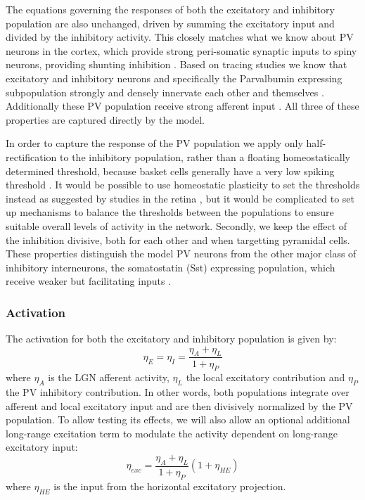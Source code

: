 The equations governing the responses of both the excitatory and
inhibitory population are also unchanged, driven by summing the
excitatory input and divided by the inhibitory activity. This closely
matches what we know about PV neurons in the cortex, which provide
strong peri-somatic synaptic inputs to spiny neurons, providing
shunting inhibition \citep{Atallah2012, Wilson2012}. Based on tracing
studies we know that excitatory and inhibitory neurons and
specifically the Parvalbumin expressing subpopulation strongly and
densely innervate each other and themselves \citep{Buzas2001, Ma2011,
  Pfeffer2013}. Additionally these PV population receive strong
afferent input \citep{Burkhalter2008}. All three of these properties
are captured directly by the model.

In order to capture the response of the PV population we apply only
half-rectification to the inhibitory population, rather than a
floating homeostatically determined threshold, because basket cells
generally have a very low spiking threshold \citep{Ma2011}.  It would
be possible to use homeostatic plasticity to set the thresholds
instead as suggested by studies in the retina \citep{Hennig2011}, but
it would be complicated to set up mechanisms to balance the thresholds
between the populations to ensure suitable overall levels of activity
in the network. Secondly, we keep the effect of the inhibition
divisive, both for each other and when targetting pyramidal
cells. These properties distinguish the model PV neurons from the
other major class of inhibitory interneurons, the somatostatin (Sst)
expressing population, which receive weaker but facilitating inputs
\citep{Beierlein2003,Bartley2008,Tan2008}.

\subsubsection{Activation}

The activation for both the excitatory and inhibitory population is
given by:
\begin{equation}
  \eta_E = \eta_I = \frac{\eta_{A} + \eta_{L}}{1 + \eta_{P}}
\end{equation}
where $\eta_{A}$ is the LGN afferent activity, $\eta_{L}$ the
local excitatory contribution and $\eta_{P}$ the PV inhibitory
contribution. In other words, both populations integrate over afferent
and local excitatory input and are then divisively normalized by the
PV population.  To allow testing its effects, we will also allow an
optional additional long-range excitation term to modulate the
activity dependent on long-range excitatory input:
\begin{equation}
  \eta_{exc} = \frac{\eta_{A} + \eta_{L}}{1 + \eta_{P}} (1+\eta_{HE})
\end{equation}
where $\eta_{HE}$ is the input from the horizontal excitatory
projection.

